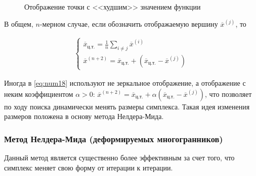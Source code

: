 \documentclass[a4paper,12pt]{report}
\begin{document}
\begin{figure}[ht]
\caption{Отображение точки с <<худшим>> значением функции}
\label{fig:simplex_example}
\end{figure}

В общем, $n$-мерном случае, если обозначить отображаемую вершину $\overline{x}^{(j)}$, то

\begin{align}
\label{eq:num18}
\begin{cases}
\overline{x}_{\text{ц.т.}} = \frac{1}{n}\sum\limits_{i \neq j}\overline{x}^{(i)} \\
\overline{x}^{(n+2)} = \overline{x}_{\text{ц.т.}} + (\overline{x}_{\text{ц.т.}} - \overline{x}^{(j)})
\end{cases}	
\end{align}

Иногда в \eqref{eq:num18} используют не зеркальное отображение, а отображение с неким коэффициентом $\alpha > 0$: $\overline{x}^{(n+2)} = \overline{x}_{\text{ц.т.}} + \alpha(\overline{x}_{\text{ц.т.}} - \overline{x}^{(j)})$, что позволяет по ходу поиска динамически менять размеры симплекса. Такая идея изменения размеров положена в основу метода Нелдера-Мида.

\subsubsection{Метод Нелдера-Мида (деформируемых многогранников)}
Данный метод является существенно более эффективным за счет того, что симплекс меняет свою форму от итерации к итерации.
\end{document}
